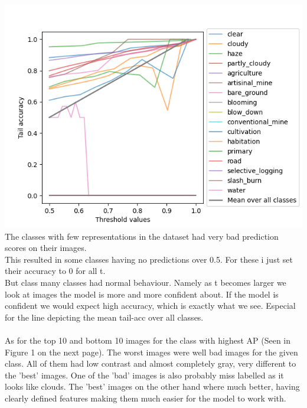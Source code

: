 \documentclass[12pt, letterpaper, twoside]{article}
\begin{document}
\includegraphics[scale=1]{"tailacc.png"}\\
The classes with few representations in the dataset had very bad prediction scores on their images.\\
This resulted in some classes having no predictions over 0.5. For these i just set their accuracy to 0 for all t.\\
But class many classes had normal behaviour. Namely as t becomes larger we look at images the model is more and more confident about. If the model is confident we would expect high accuracy, which is exactly what we see. Especial for the line depicting the mean tail-acc over all classes.\\
\ \\
As for the top 10 and bottom 10 images for the class with highest AP (Seen in Figure 1 on the next page). The worst images were well bad images for the given class. All of them had low contrast and almost completely gray, very different to the 'best' images. One of the 'bad' images is also probably miss labelled as it looks like clouds. The 'best' images on the other hand where much better, having clearly defined features making them much easier for the model to work with.\\
\newpage
\ \\
\end{document}

